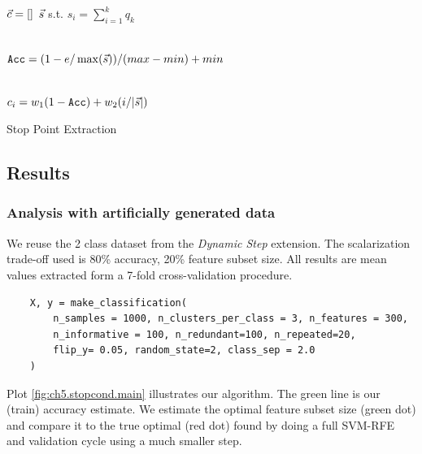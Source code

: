 \begin{algorithm}
    \DontPrintSemicolon
      $\vec{c} = []$ 
      $\vec{s}$ \quad s.t. \quad $s_i = \sum_{i = 1}^k q_k$\VS
      
        {
            \\
            $\texttt{Acc} = (1 - e / \max(\vec{s})) / (max - min) + min$\VS

            \\
            $c_i = w_1 (1 - \texttt{Acc}) + w_2 (i / |\vec{s}|)$
        }
    \caption{Stop Point Extraction}
    \label{alg:svmrfe.stopcond.extract}
\end{algorithm}

\subsection{Results}

\subsubsection*{Analysis with artificially generated data}

We reuse the 2 class dataset from the \emph{Dynamic Step} extension. The scalarization trade-off used is 80\% accuracy, 20\% feature subset size. All results are mean values extracted form a 7-fold cross-validation procedure.

\begin{verbatim}
    X, y = make_classification(
        n_samples = 1000, n_clusters_per_class = 3, n_features = 300, 
        n_informative = 100, n_redundant=100, n_repeated=20,
        flip_y= 0.05, random_state=2, class_sep = 2.0
    )
\end{verbatim}\VS

Plot \ref{fig:ch5.stopcond.main} illustrates our algorithm. The green line is our (train) accuracy estimate. We estimate the optimal feature subset size (green dot) and compare it to the true optimal (red dot) found by doing a full SVM-RFE and validation cycle using a much smaller step.

